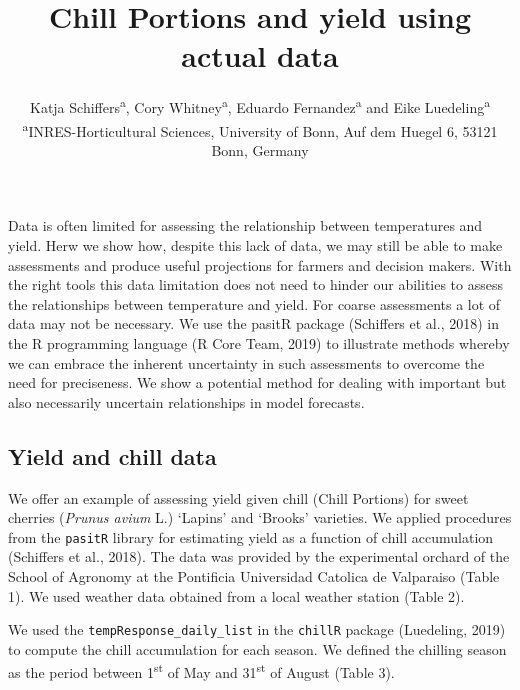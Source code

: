 \documentclass[]{article}
\title{Chill Portions and yield using actual data}
\author{Katja Schiffers\textsuperscript{a}, Cory Whitney\textsuperscript{a},
Eduardo Fernandez\textsuperscript{a} and Eike
Luedeling\textsuperscript{a} \textsuperscript{a}INRES-Horticultural
Sciences, University of Bonn, Auf dem Huegel 6, 53121 Bonn, Germany}
\date{}
\begin{document}
\maketitle

Data is often limited for assessing the relationship between
temperatures and yield. Herw we show how, despite this lack of data, we
may still be able to make assessments and produce useful projections for
farmers and decision makers. With the right tools this data limitation
does not need to hinder our abilities to assess the relationships
between temperature and yield. For coarse assessments a lot of data may
not be necessary. We use the pasitR package (Schiffers et al., 2018) in
the R programming language (R Core Team, 2019) to illustrate methods
whereby we can embrace the inherent uncertainty in such assessments to
overcome the need for preciseness. We show a potential method for
dealing with important but also necessarily uncertain relationships in
model forecasts.

\hypertarget{yield-and-chill-data}{%
\subsection{Yield and chill data}\label{yield-and-chill-data}}

We offer an example of assessing yield given chill (Chill Portions) for
sweet cherries (\emph{Prunus avium} L.) `Lapins' and `Brooks' varieties.
We applied procedures from the \texttt{pasitR} library for estimating
yield as a function of chill accumulation (Schiffers et al., 2018). The
data was provided by the experimental orchard of the School of Agronomy
at the Pontificia Universidad Catolica de Valparaiso (Table 1). We used
weather data obtained from a local weather station (Table 2).

We used the \texttt{tempResponse\_daily\_list} in the \texttt{chillR}
package (Luedeling, 2019) to compute the chill accumulation for each
season. We defined the chilling season as the period between
1\textsuperscript{st} of May and 31\textsuperscript{st} of August (Table
3).
\end{document}
